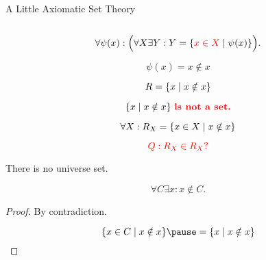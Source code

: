 \begin{frame}{}
  \centerline{\Large A Little Axiomatic Set Theory }

  \vspace{0.80cm}
  \begin{columns}
  \end{columns}
\end{frame}



\begin{frame}{}
  \begin{definition}
    \[
      \forall \psi(x): \Big(\forall X \exists Y: Y = \{\textcolor{red}{x \in X} \mid \psi(x)\}\Big).
    \]
  \end{definition}
\end{frame}

\begin{frame}{}
  \[
    \psi(x) = x \notin x
  \]

  \pause
  \[
    R = \{x \mid x \notin x\}
  \]

  \pause
  \begin{theorem}
    \[
      \{x \mid x \notin x\} \textcolor{red}{\text{\bf \;is not a set.}}
    \]
  \end{theorem}
\end{frame}

\begin{frame}{}
  \[
    \forall X: R_X = \{x \in X \mid x \notin x\}
  \]

  \pause
  \[
    \textcolor{red}{Q: R_X \in R_X ?}
  \]

  \pause
  \begin{theorem}
    There is no universe set. 

    \pause
    \[
      \forall C \exists x: x \notin C.
    \]
  \end{theorem}

  \pause
  \begin{proof}
    \centerline{By contradiction.}

    \pause
    \[
      \set{x \in C \mid x \notin x} \pause = \set{x \mid x \notin x}
    \]
  \end{proof}
\end{frame}

